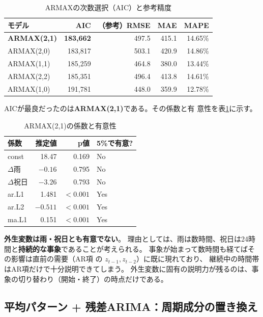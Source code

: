 \documentclass[a4paper,11pt]{ltjsarticle}
\begin{document}
\begin{table}[htbp]
  \centering
  \caption{ARMAXの次数選択（AIC）と参考精度}
  \begin{tabular}{lrrrr}
    \toprule
    モデル & AIC & （参考）RMSE & MAE & MAPE \\
    \midrule
    \textbf{ARMAX(2,1)} & \textbf{183,662} & 497.5 & 415.1 & 14.65\% \\
    ARMAX(2,0) & 183,817 & 503.1 & 420.9 & 14.86\% \\
    ARMAX(1,1) & 185,259 & 464.8 & 380.0 & 13.44\% \\
    ARMAX(2,2) & 185,351 & 496.4 & 413.8 & 14.61\% \\
    ARMAX(1,0) & 191,781 & 448.0 & 359.9 & 12.78\% \\
    \bottomrule
  \end{tabular}
\end{table}

AICが最良だったのは\textbf{ARMAX(2,1)}である。その係数と有
意性を表\ref{tab:armax-coef}に示す。

\begin{table}[htbp]
  \centering
  \caption{ARMAX(2,1)の係数と有意性}
  \label{tab:armax-coef}
  \begin{tabular}{lrrl}
    \toprule
    係数 & 推定値 & p値 & 5\%で有意? \\
    \midrule
    const & 18.47 & 0.169 & No \\
    $\Delta$雨 & $-0.16$ & 0.795 & No \\
    $\Delta$祝日 & $-3.26$ & 0.793 & No \\
    ar.L1 & 1.481 & $<0.001$ & Yes \\
    ar.L2 & $-0.511$ & $<0.001$ & Yes \\
    ma.L1 & 0.151 & $<0.001$ & Yes \\
    \bottomrule
  \end{tabular}
\end{table}

\textbf{外生変数は雨・祝日とも有意でない}。
理由としては、雨は数時間、祝日は24時間と\textbf{持続的な事象}であることが考えられる。
事象が始まって数時間も経てばその影響は直前の需要（AR項
の $z_{t-1}, z_{t-2}$）に既に現れており、
継続中の時間帯はAR項だけで十分説明できてしまう。
外生変数に固有の説明力が残るのは、事象の切り替わり（開始・終了）の時点だけである。

\subsection{平均パターン + 残差ARIMA：周期成分の置き換え}
\label{sec:profile}
\end{document}
